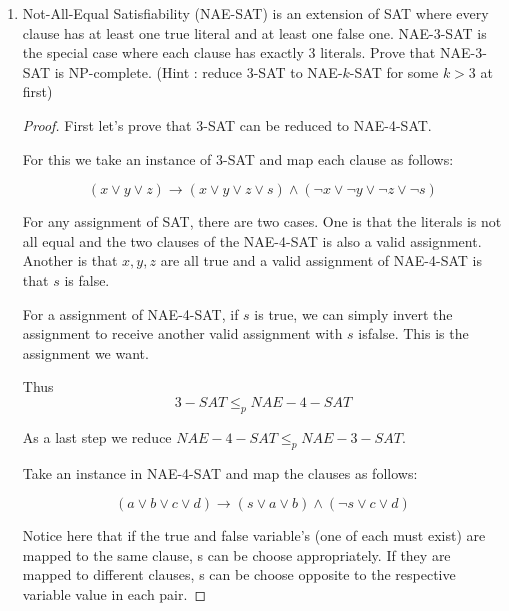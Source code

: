 \documentclass[12pt,a4paper]{article}
\theoremstyle{definition}
\begin{document}
\begin{enumerate}
\begin{proof}
\begin{figure}[H]
		\end{figure}

		Vertex-cover size $\le k$ iff $|S'|\le K$

		$\Rightarrow:$ For given vertex-cover, all vertex been covered represents that all complete graph is covered. Thus all opinions in ELECTION problem is covered. It's clear that $K=k$

		$\Leftarrow:$ For given instance of ELECTION, all opinions been covered all means all complete graph is covered. And the vertex size $k=K$.

		Therefore ELECTION problem is NP-complete.
	
	\end{proof}

	\item Not-All-Equal Satisfiability (NAE-SAT) is an extension of SAT where every clause has at least one true literal and at least one false one. NAE-$3$-SAT is the special case where each clause has exactly $3$ literals. Prove that NAE-$3$-SAT is NP-complete. (Hint : reduce $3$-SAT to NAE-$k$-SAT for some $k > 3$ at first)
	    \begin{proof}
	   First let's prove that 3-SAT can be reduced to NAE-4-SAT.
	   
	   For this we take an instance of 3-SAT and map each clause as follows:

	   $$(x\lor y\lor z)\rightarrow (x\lor y\lor z\lor s)\land (\lnot x\lor \lnot y\lor \lnot z\lor \lnot s)$$
	
	   For any assignment of SAT, there are  two cases. One is that the literals is not all equal and the two clauses of the NAE-4-SAT is also a valid assignment. Another is that $x,y,z$ are all true and a valid assignment of NAE-4-SAT is that $s$ is false.

	   For a assignment of NAE-4-SAT, if $s$ is true, we can simply invert the assignment to receive another valid assignment with $s$ isfalse. This is the assignment we want.
	
	   Thus $$3-SAT\le_pNAE-4-SAT$$

	   As a last step we reduce $NAE-4-SAT\le_pNAE-3-SAT$. 
	   
	   Take an instance in NAE-4-SAT and map the clauses as follows:

	   $$(a\lor b\lor c\lor d)\rightarrow (s\lor a\lor b)\land (\lnot s\lor c\lor d)$$

	   Notice here that if the true and false variable's (one of each must exist) are mapped to the same clause, s can be choose appropriately. If they are mapped to different clauses, s can be choose opposite to the respective variable value in each pair.


\end{proof}
\end{enumerate}
\end{document}
